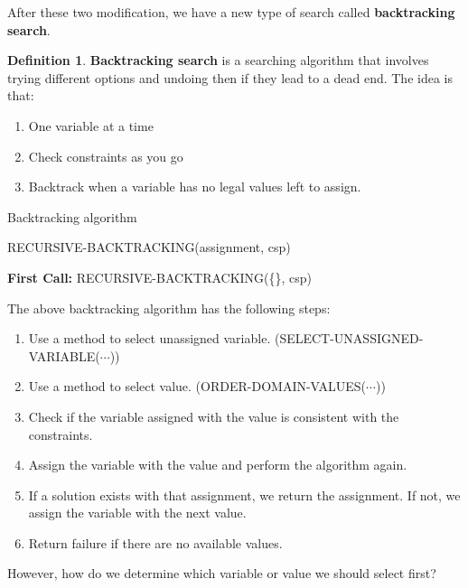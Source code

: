 \documentclass{article}
\theoremstyle{definition}
\newtheorem{definition}{Definition}[section]
\begin{document}
After these two modification, we have a new type of search called \textbf{backtracking search}.
\begin{definition}
	\textbf{Backtracking search} is a searching algorithm that involves trying different options and undoing then if they lead to a dead end. The idea is that:
	\begin{enumerate}
		\item One variable at a time
		\item Check constraints as you go
		\item Backtrack when a variable has no legal values left to assign.
	\end{enumerate}
\end{definition}

\newpage
\begin{algorithm}
\caption{Backtracking algorithm}
RECURSIVE-BACKTRACKING(assignment, csp)
\begin{algorithmic}
	\EndIf
			\EndIf
		\EndIf
	\EndFor
\end{algorithmic}
	\textbf{First Call: }RECURSIVE-BACKTRACKING(\{\}, csp)
\end{algorithm}
The above backtracking algorithm has the following steps:
\begin{enumerate}
	\item Use a method to select unassigned variable. (SELECT-UNASSIGNED-VARIABLE($\cdots$))
	\item Use a method to select value. (ORDER-DOMAIN-VALUES($\cdots$))
	\item Check if the variable assigned with the value is consistent with the constraints.
	\item Assign the variable with the value and perform the algorithm again.
	\item If a solution exists with that assignment, we return the assignment. If not, we assign the variable with the next value.
	\item Return failure if there are no available values.
\end{enumerate}
However, how do we determine which variable or value we should select first?
\end{document}
